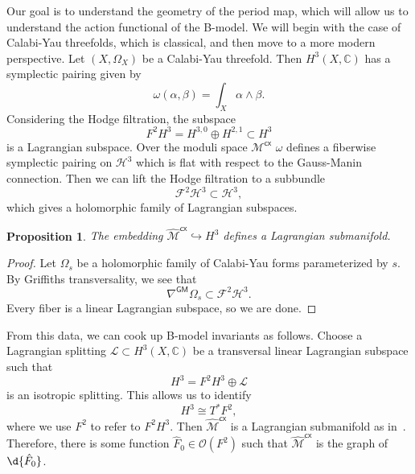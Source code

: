 \documentclass[article,10pt,oneside,oldfontcommands]{memoir}
\newtheorem{prop}[thm]{Proposition}
\theoremstyle{definition}
\theoremstyle{remark}
\theoremstyle{plain}
\theoremstyle{definition}
\theoremstyle{remark}
\newcommand{\C}{\mathbb{C}}
\newcommand{\mc}[1]{\mathcal{#1}}
\newcommand{\ms}[1]{\mathsf{#1}}
\newcommand{\1}{\mathbf{1}}
\newcommand{\2}{\mathbf{2}}
\newcommand{\3}{\mathbf{3}}
\begin{document}
Our goal is to understand the geometry of the period map, which will allow us to understand the action functional of the B-model. We will begin with the case of Calabi-Yau threefolds, which is classical, and then move to a more modern perspective. Let \((X, \Omega_X)\) be a Calabi-Yau threefold. Then \(H^3(X, \C)\) has a symplectic pairing given by
\[ \omega(\alpha, \beta) = \int_X \alpha \wedge \beta. \]
Considering the Hodge filtration, the subspace
\[ F^2 H^3 = H^{3,0} \oplus H^{2,1} \subset H^3 \]
is a Lagrangian subspace. Over the moduli space \(\mc{M}^{\ms{cx}}\) \(\omega\) defines a fiberwise symplectic pairing on \(\mc{H}^3\) which is flat with respect to the Gauss-Manin connection. Then we can lift the Hodge filtration to a subbundle
\[ \mc{F}^2 \mc{H}^3 \subset \mc{H}^3, \]
which gives a holomorphic family of Lagrangian subspaces. 

\begin{prop}
    The embedding \(\hat{\mc{M}}^{\ms{cx}} \hookrightarrow H^3\) defines a Lagrangian submanifold.
\end{prop}

\begin{proof}
    Let \(\Omega_s\) be a holomorphic family of Calabi-Yau forms parameterized by \(s\). By Griffiths transversality, we see that
    \[ \nabla^{\ms{GM}} \Omega_s \subset \mc{F}^2 \mc{H}^3. \]
    Every fiber is a linear Lagrangian subspace, so we are done.
\end{proof}

From this data, we can cook up B-model invariants as follows. Choose a Lagrangian splitting \(\mc{L} \subset H^3(X, \C)\) be a transversal linear Lagrangian subspace such that
\[ H^3 = F^2 H^3 \oplus \mc{L} \]
is an isotropic splitting. This allows us to identify
\[ H^3 \cong T^* F^2, \]
where we use \(F^2\) to refer to \(F^2 H^3\). Then \(\hat{\mc{M}}^{\ms{cx}}\) is a Lagrangian submanifold as in~. Therefore, there is some function \(\hat{F}_0 \in \mc{O}(F^2)\) such that \(\hat{\mc{M}}^{\ms{cx}}\) is the graph of \(\d{\hat{F}_0}\). 
\end{document}
